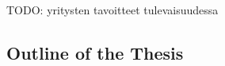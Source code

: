 TODO: yritysten tavoitteet tulevaisuudessa










\subsection{Outline of the Thesis}






\begin{center}
\end{center}




